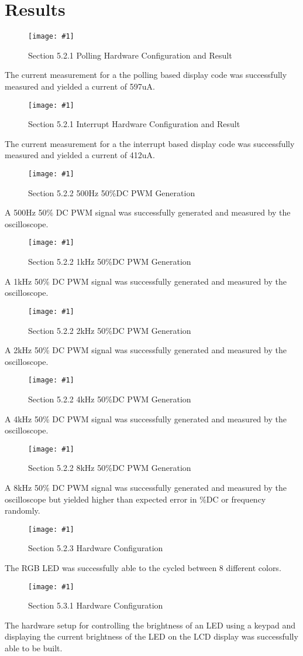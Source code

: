 \documentclass[journal]{IEEEtran}
\newcommand\createfigure[2]{
  \begin{figure}[H]
    \centering \texttt{[image: \#1]}
    \caption{#2}
  \end{figure}}
\begin{document}
\section{Results}
\createfigure{./Figures/5.2.1-Polling.jpg}{Section 5.2.1 Polling Hardware Configuration and Result}
The current measurement for a the polling based display code was successfully measured and yielded a current of 597uA.
\createfigure{./Figures/5.2.1-Interrupt.jpg}{Section 5.2.1 Interrupt Hardware Configuration and Result}
The current measurement for a the interrupt based display code was successfully measured and yielded a current of 412uA.
\createfigure{./Figures/5.2.2-500Hz.jpg}{Section 5.2.2 500\si{Hz} 50\%DC PWM Generation}
A 500\si{\Hz} 50\% DC PWM signal was successfully generated and measured by the oscilloscope.
\createfigure{./Figures/5.2.2-1kHz.jpg}{Section 5.2.2 1\si{kHz} 50\%DC PWM Generation}
A 1\si{\kHz} 50\% DC PWM signal was successfully generated and measured by the oscilloscope.
\createfigure{./Figures/5.2.2-2kHz.jpg}{Section 5.2.2 2\si{kHz} 50\%DC PWM Generation}
A 2\si{\kHz} 50\% DC PWM signal was successfully generated and measured by the oscilloscope.
\createfigure{./Figures/5.2.2-4kHz.jpg}{Section 5.2.2 4\si{kHz} 50\%DC PWM Generation}
A 4\si{\kHz} 50\% DC PWM signal was successfully generated and measured by the oscilloscope.
\createfigure{./Figures/5.2.2-8kHz.jpg}{Section 5.2.2 8\si{kHz} 50\%DC PWM Generation}
A 8\si{\kHz} 50\% DC PWM signal was successfully generated and measured by the oscilloscope but yielded higher than expected error in \%DC or frequency randomly.
\createfigure{./Figures/5.2.3-Setup.jpg}{Section 5.2.3 Hardware Configuration}
The RGB LED was successfully able to the cycled between 8 different colors.
\createfigure{./Figures/5.3.1-Setup.jpg}{Section 5.3.1 Hardware Configuration}
The hardware setup for controlling the brightness of an LED using a keypad and displaying the current brightness of the LED on the LCD display was successfully able to be built.
\nocite{rojasEmbeddedSystemsDesign2016}
\nocite{LCDControllerDatasheets}


\end{document}
